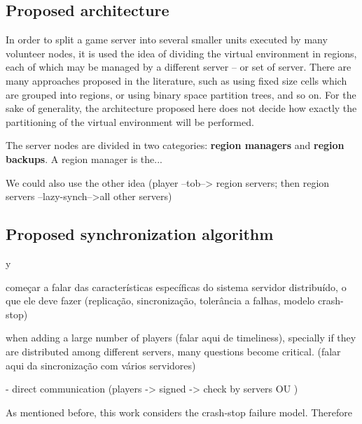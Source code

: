 \documentclass[]{usiinfprospectus}
\begin{document}
\subsection{Proposed architecture} \label{sec:arch}

In order to split a game server into several smaller units executed by many volunteer nodes, it is used the idea of dividing the virtual environment in regions, each of which may be managed by a different server -- or set of server. There are many approaches proposed in the literature, such as using fixed size cells which are grouped into regions, or using binary space partition trees, and so on. For the sake of generality, the architecture proposed here  does not decide how exactly the partitioning of the virtual environment will be performed.

The server nodes are divided in two categories: \textbf{region managers} and \textbf{region backups}. A region manager is the...

We could also use the other idea (player --tob--> region servers; then region servers --lazy-synch-->all other servers)


\subsection{Proposed synchronization algorithm} \label{sec:algorithm}

y


começar a falar das características específicas do sistema servidor distribuído, o que ele deve fazer (replicação, sincronização, tolerância a falhas, modelo crash-stop)

when adding a large number of players (falar aqui de timeliness), specially if they are distributed among different servers, many questions become critical. (falar aqui da sincronização com vários servidores)

- direct communication (players -> signed -> check by servers OU )


As mentioned before, this work considers the crash-stop failure model. Therefore



\end{document}
